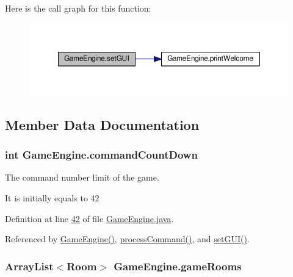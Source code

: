 Here is the call graph for this function\-:
\nopagebreak
\begin{figure}[H]
\begin{center}
\leavevmode
\includegraphics[width=350pt]{classGameEngine_aec901a5b590b3cd204f196165da5dfb6_cgraph}
\end{center}
\end{figure}




\subsection{Member Data Documentation}
\hypertarget{classGameEngine_ad4ff8d760eced9c7b76cdeb0dc989975}{
\subsubsection[{command\-Count\-Down}]{\setlength{\rightskip}{0pt plus 5cm}int Game\-Engine.\-command\-Count\-Down\hspace{0.3cm}{\ttfamily [private]}}}\label{classGameEngine_ad4ff8d760eced9c7b76cdeb0dc989975}


The command number limit of the game. 

It is initially equals to 42 

Definition at line \hyperlink{GameEngine_8java_source_l00042}{42} of file \hyperlink{GameEngine_8java_source}{Game\-Engine.\-java}.



Referenced by \hyperlink{GameEngine_8java_source_l00047}{Game\-Engine()}, \hyperlink{GameEngine_8java_source_l00167}{process\-Command()}, and \hyperlink{GameEngine_8java_source_l00059}{set\-G\-U\-I()}.

\hypertarget{classGameEngine_ae5a2f252ec103e0630aebb8635341ea4}{
\subsubsection[{game\-Rooms}]{\setlength{\rightskip}{0pt plus 5cm}Array\-List$<${\bf Room}$>$ Game\-Engine.\-game\-Rooms\hspace{0.3cm}{\ttfamily [package]}}}\label{classGameEngine_ae5a2f252ec103e0630aebb8635341ea4}


